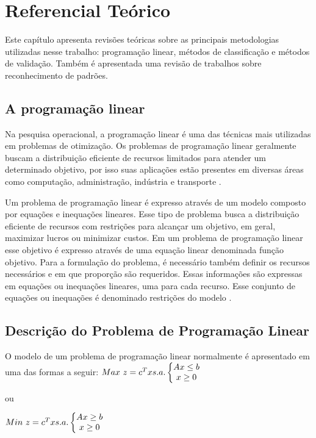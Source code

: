\chapter{Referencial Teórico}
Este capítulo apresenta revisões teóricas sobre as principais metodologias utilizadas nesse trabalho: programação linear, métodos de classificação e métodos de validação. Também é apresentada uma revisão de trabalhos sobre reconhecimento de padrões.  

\section{A programação linear}
Na pesquisa operacional, a programação linear é uma das técnicas mais utilizadas em problemas de otimização. Os problemas de programação linear geralmente buscam a distribuição eficiente de recursos limitados para atender um determinado objetivo, por isso suas aplicações estão presentes em diversas áreas como computação, administração, indústria e transporte \cite{Engecom}.

Um problema de programação linear é expresso através de um modelo composto por equações e inequações lineares. Esse tipo de problema busca a distribuição eficiente de recursos com restrições para alcançar um objetivo, em geral, maximizar lucros ou minimizar custos. Em um problema de programação linear esse objetivo é expresso através de uma equação linear denominada função objetivo. Para a formulação do problema, é necessário também definir os recursos necessários e em que proporção são requeridos. Essas informações são expressas em equações ou inequações lineares, uma para cada recurso. Esse conjunto de equações ou inequações é denominado restrições do modelo \cite{Engecom}.

\section{Descrição do Problema de Programação Linear}
O modelo de um problema de programação linear normalmente é apresentado em uma das formas a seguir:
$\\Max\ z = c^{T}x \\*s.a.\left\{\begin{matrix}
Ax\leq b\\*x\geq 0 
\end{matrix}\right.$  

ou  

$\\Min\ z = c^{T}x \\*s.a.\left\{\begin{matrix}
Ax\geq  b\\*x\geq 0 
\end{matrix}\right.$


